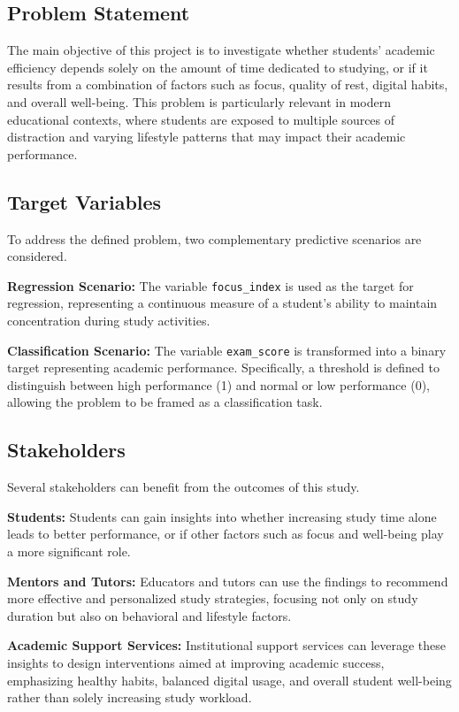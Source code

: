 
\subsection{Problem Statement}

The main objective of this project is to investigate whether students' academic efficiency depends solely on the amount of time dedicated to studying, or if it results from a combination of factors such as focus, quality of rest, digital habits, and overall well-being. This problem is particularly relevant in modern educational contexts, where students are exposed to multiple sources of distraction and varying lifestyle patterns that may impact their academic performance.

\subsection{Target Variables}

To address the defined problem, two complementary predictive scenarios are considered.

\textbf{Regression Scenario:}  
The variable \texttt{focus\_index} is used as the target for regression, representing a continuous measure of a student's ability to maintain concentration during study activities.

\textbf{Classification Scenario:}  
The variable \texttt{exam\_score} is transformed into a binary target representing academic performance. Specifically, a threshold is defined to distinguish between high performance (1) and normal or low performance (0), allowing the problem to be framed as a classification task.

\subsection{Stakeholders}

Several stakeholders can benefit from the outcomes of this study.

\textbf{Students:}  
Students can gain insights into whether increasing study time alone leads to better performance, or if other factors such as focus and well-being play a more significant role.

\textbf{Mentors and Tutors:}  
Educators and tutors can use the findings to recommend more effective and personalized study strategies, focusing not only on study duration but also on behavioral and lifestyle factors.

\textbf{Academic Support Services:}  
Institutional support services can leverage these insights to design interventions aimed at improving academic success, emphasizing healthy habits, balanced digital usage, and overall student well-being rather than solely increasing study workload.
